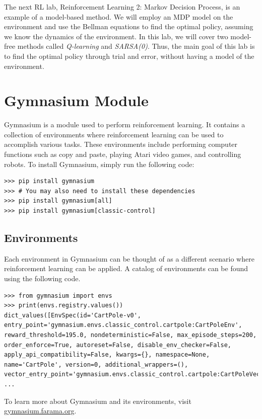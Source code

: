 The next RL lab, Reinforcement Learning 2: Markov Decision Process, is an example of a model-based method.
We will employ an MDP model on the environment and use the Bellman equations to find the optimal policy, assuming we know the dynamics of the environment.
In this lab, we will cover two model-free methods called \emph{Q-learning} and \emph{SARSA(0)}.
Thus, the main goal of this lab is to find the optimal policy through trial and error, without having a model of the environment.


\section*{Gymnasium Module}
Gymnasium is a module used to perform reinforcement learning.
It contains a collection of environments where reinforcement learning can be used to accomplish various tasks.
These environments include performing computer functions such as copy and paste, playing Atari video games, and controlling robots.
To install Gymnasium, simply run the following code:
\begin{lstlisting}
>>> pip install gymnasium
>>> # You may also need to install these dependencies
>>> pip install gymnasium[all]
>>> pip install gymnasium[classic-control]
\end{lstlisting}

\subsection*{Environments}

Each environment in Gymnasium can be thought of as a different scenario where reinforcement learning can be applied.
A catalog of environments can be found using the following code.

\begin{lstlisting}
>>> from gymnasium import envs
>>> print(envs.registry.values())
dict_values([EnvSpec(id='CartPole-v0', entry_point='gymnasium.envs.classic_control.cartpole:CartPoleEnv', reward_threshold=195.0, nondeterministic=False, max_episode_steps=200, order_enforce=True, autoreset=False, disable_env_checker=False, apply_api_compatibility=False, kwargs={}, namespace=None, name='CartPole', version=0, additional_wrappers=(), vector_entry_point='gymnasium.envs.classic_control.cartpole:CartPoleVectorEnv'), ...
\end{lstlisting}
To learn more about Gymnasium and its environments, visit \url{gymnasium.farama.org}.

